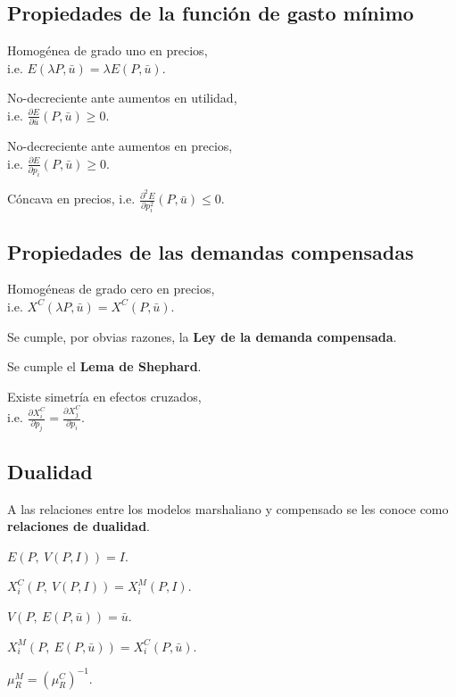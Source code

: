 \documentclass[8pt,a4paper]{extarticle}
\begin{document}
\begin{multicols}{3}
\subsection{Propiedades de la función de gasto mínimo}

\begin{eqlist}
\item Homogénea de grado uno en precios, \\ i.e. $E(\lambda P, \bar{u}) = \lambda E (P, \bar{u})$.
\item No-decreciente ante aumentos en utilidad, \\ i.e. $\displaystyle \frac{\partial E}{\partial \bar{u}} (P, \bar{u}) \geq  0$.
\item No-decreciente ante aumentos en precios, \\ i.e. $\displaystyle \frac{\partial E}{\partial p_i} (P, \bar{u}) \geq 0$.
\item Cóncava en precios, i.e. $\displaystyle \frac{\partial^2 E}{\partial p_i^2} (P, \bar{u}) \le 0$.
\end{eqlist}

\subsection{Propiedades de las demandas compensadas}

\begin{eqlist}
\item Homogéneas de grado cero en precios, \\ i.e. $X^C (\lambda P, \bar{u}) = X^C (P, \bar{u})$.
\item Se cumple, por obvias razones, la \textbf{Ley de la demanda compensada}.
\item Se cumple el \textbf{Lema de Shephard}.
\item Existe simetría en efectos cruzados, \\ i.e. $\displaystyle \frac{\partial X_i^C}{\partial p_j} = \frac{\partial X_j^C}{\partial p_i}$.
\end{eqlist}

\subsection{Dualidad}

A las relaciones entre los modelos marshaliano y compensado se les conoce como \textbf{relaciones de dualidad}.

\begin{eqlist}
\item $E (P,\ V(P, I))=I$.
\item $X_i^C (P,\ V(P, I)) = X_i^M (P, I)$.
\item $V(P,\ E(P, \bar{u})) = \bar{u}$.
\item $X_i^M (P,\ E(P, \bar{u})) = X_i^C (P, \bar{u})$.
\item $\mu_R^M = \displaystyle \left(\mu_R^C\right)^{-1}$.
\end{eqlist}


\end{multicols}
\end{document}
